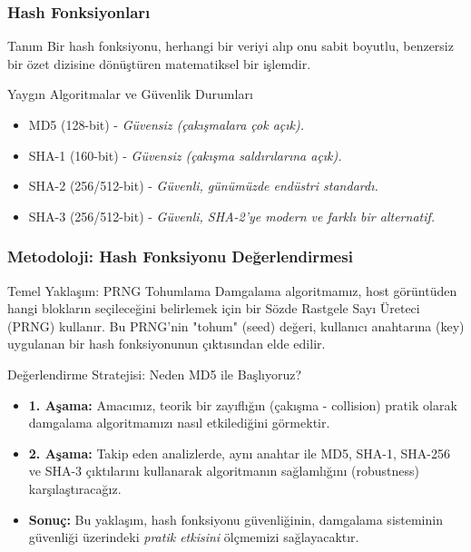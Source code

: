 \documentclass[aspectratio=169,xcolor={dvipsnames}]{beamer}
\begin{document}
\begin{frame}
  \frametitle{Hash Fonksiyonları}
  
  \begin{block}{Tanım}
    Bir hash fonksiyonu, herhangi bir veriyi alıp onu sabit boyutlu, benzersiz bir özet dizisine dönüştüren matematiksel bir işlemdir.
  \end{block}
  
  \vfill
  
  \begin{block}{Yaygın Algoritmalar ve Güvenlik Durumları}
    \begin{itemize}
      \item MD5 (128-bit) - \textit{Güvensiz (çakışmalara çok açık).}
      \item SHA-1 (160-bit) - \textit{Güvensiz (çakışma saldırılarına açık).}
      \item SHA-2 (256/512-bit) - \textit{Güvenli, günümüzde endüstri standardı.}
      \item SHA-3 (256/512-bit) - \textit{Güvenli, SHA-2'ye modern ve farklı bir alternatif.}
    \end{itemize}
  \end{block}
  
\end{frame}


\begin{frame}
  \frametitle{Metodoloji: Hash Fonksiyonu Değerlendirmesi}
  
  \begin{block}{Temel Yaklaşım: PRNG Tohumlama}
    Damgalama algoritmamız, host görüntüden hangi blokların seçileceğini belirlemek için bir Sözde Rastgele Sayı Üreteci (PRNG) kullanır.
    \vfill
    Bu PRNG'nin "tohum" (seed) değeri, kullanıcı anahtarına (key) uygulanan bir hash fonksiyonunun çıktısından elde edilir.
    \vfill
  \end{block}
  
  
  \begin{alertblock}{Değerlendirme Stratejisi: Neden MD5 ile Başlıyoruz?}
    \begin{itemize}
        \item \textbf{1. Aşama:} Amacımız, teorik bir zayıflığın (çakışma - collision) pratik olarak damgalama algoritmamızı nasıl etkilediğini görmektir.
        \item \textbf{2. Aşama:} Takip eden analizlerde, aynı anahtar ile MD5, SHA-1, SHA-256 ve SHA-3 çıktılarını kullanarak algoritmanın sağlamlığını (robustness) karşılaştıracağız.
        \item \textbf{Sonuç:} Bu yaklaşım, hash fonksiyonu güvenliğinin, damgalama sisteminin güvenliği üzerindeki \textit{pratik etkisini} ölçmemizi sağlayacaktır.
    \end{itemize}
  \end{alertblock}
  
\end{frame}
\end{document}
